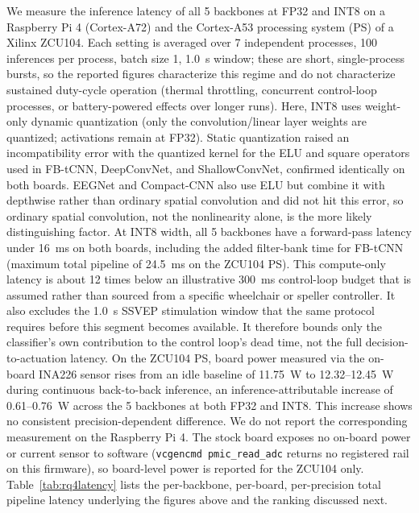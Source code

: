 \documentclass[11pt,a4paper,twoside,asymmetric]{article}
\begin{document}
We measure the inference latency of all 5 backbones at FP32 and INT8 on a Raspberry Pi 4 (Cortex-A72) and the Cortex-A53 processing system (PS) of a Xilinx ZCU104. Each setting is averaged over 7 independent processes, 100 inferences per process, batch size 1, 1.0~s window; these are short, single-process bursts, so the reported figures characterize this regime and do not characterize sustained duty-cycle operation (thermal throttling, concurrent control-loop processes, or battery-powered effects over longer runs). Here, INT8 uses weight-only dynamic quantization (only the convolution/linear layer weights are quantized; activations remain at FP32). Static quantization raised an incompatibility error with the quantized kernel for the ELU and square operators used in FB-tCNN, DeepConvNet, and ShallowConvNet, confirmed identically on both boards. EEGNet and Compact-CNN also use ELU but combine it with depthwise rather than ordinary spatial convolution and did not hit this error, so ordinary spatial convolution, not the nonlinearity alone, is the more likely distinguishing factor. At INT8 width, all 5 backbones have a forward-pass latency under 16~ms on both boards, including the added filter-bank time for FB-tCNN (maximum total pipeline of 24.5~ms on the ZCU104 PS). This compute-only latency is about 12 times below an illustrative 300~ms control-loop budget that is assumed rather than sourced from a specific wheelchair or speller controller. It also excludes the 1.0~s SSVEP stimulation window that the same protocol requires before this segment becomes available. It therefore bounds only the classifier's own contribution to the control loop's dead time, not the full decision-to-actuation latency. On the ZCU104 PS, board power measured via the on-board INA226 sensor rises from an idle baseline of 11.75~W to 12.32--12.45~W during continuous back-to-back inference, an inference-attributable increase of 0.61--0.76~W across the 5 backbones at both FP32 and INT8. This increase shows no consistent precision-dependent difference. We do not report the corresponding measurement on the Raspberry Pi 4. The stock board exposes no on-board power or current sensor to software (\texttt{vcgencmd pmic\_read\_adc} returns no registered rail on this firmware), so board-level power is reported for the ZCU104 only. Table~\ref{tab:rq4latency} lists the per-backbone, per-board, per-precision total pipeline latency underlying the figures above and the ranking discussed next.
\end{document}

